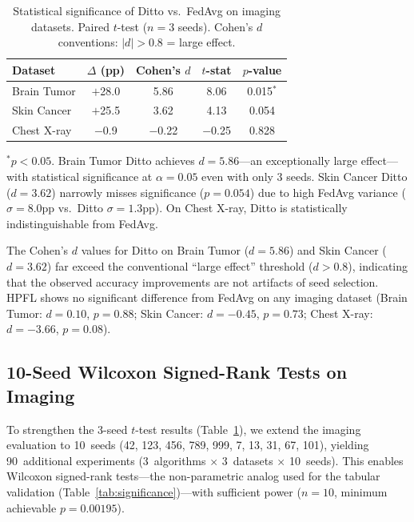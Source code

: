 \documentclass[conference,a4paper]{IEEEtran}
\begin{document}
\begin{table}[htbp]
\centering
\caption{Statistical significance of Ditto vs.\ FedAvg on imaging datasets. Paired $t$-test ($n{=}3$ seeds). Cohen's $d$ conventions: $|d|{>}0.8$ = large effect.}
\label{tab:imaging_significance}
\small
\begin{tabular}{lcccc}
\toprule
\textbf{Dataset} & \textbf{$\Delta$ (pp)} & \textbf{Cohen's $d$} & \textbf{$t$-stat} & \textbf{$p$-value} \\
\midrule
Brain Tumor & $+$28.0 & 5.86 & 8.06 & 0.015$^{*}$ \\
Skin Cancer & $+$25.5 & 3.62 & 4.13 & 0.054 \\
Chest X-ray & $-$0.9 & $-$0.22 & $-$0.25 & 0.828 \\
\bottomrule
\end{tabular}
\par{\footnotesize $^{*}p < 0.05$. Brain Tumor Ditto achieves $d{=}5.86$---an exceptionally large effect---with statistical significance at $\alpha{=}0.05$ even with only 3 seeds. Skin Cancer Ditto ($d{=}3.62$) narrowly misses significance ($p{=}0.054$) due to high FedAvg variance ($\sigma{=}8.0$pp vs.\ Ditto $\sigma{=}1.3$pp). On Chest X-ray, Ditto is statistically indistinguishable from FedAvg.}
\end{table}

The Cohen's $d$ values for Ditto on Brain Tumor ($d{=}5.86$) and Skin Cancer ($d{=}3.62$) far exceed the conventional ``large effect'' threshold ($d{>}0.8$), indicating that the observed accuracy improvements are not artifacts of seed selection. HPFL shows no significant difference from FedAvg on any imaging dataset (Brain Tumor: $d{=}0.10$, $p{=}0.88$; Skin Cancer: $d{=}-0.45$, $p{=}0.73$; Chest X-ray: $d{=}-3.66$, $p{=}0.08$).

\subsection{10-Seed Wilcoxon Signed-Rank Tests on Imaging}
\label{sec:imaging_wilcoxon}

To strengthen the 3-seed $t$-test results (Table~\ref{tab:imaging_significance}), we extend the imaging evaluation to 10~seeds (42, 123, 456, 789, 999, 7, 13, 31, 67, 101), yielding 90~additional experiments (3~algorithms $\times$ 3~datasets $\times$ 10~seeds). This enables Wilcoxon signed-rank tests---the non-parametric analog used for the tabular validation (Table~\ref{tab:significance})---with sufficient power ($n{=}10$, minimum achievable $p = 0.00195$).
\end{document}
